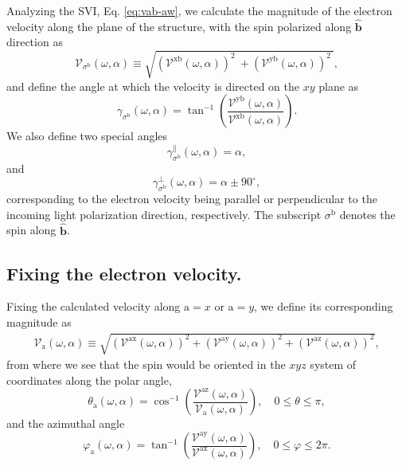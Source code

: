 \documentclass[floatfix,prb,aps,superscriptaddress,showpacs,11pt,preprint,letterpaper]{revtex4}
\begin{document}
Analyzing the SVI, Eq. \eqref{eq:vab-aw}, we calculate the magnitude
of the electron velocity along the plane of the structure, with the spin
polarized along $\hat{\mathbf{b}}$ direction as
\begin{equation}
\mathcal{V}_{\sigma^{\mathrm{b}}}(\omega,\alpha)
\equiv
\sqrt{
\left(\mathcal{V}^{\mathrm{xb}}(\omega,\alpha)\right)^{2}\ +
\left(\mathcal{V}^{\mathrm{yb}}(\omega,\alpha)\right)^{2}\ 
}, 
\label{eq:vs-mag}
\end{equation}
and define the angle at which the velocity is directed on the $xy$ plane as
\begin{equation}
\gamma_{\sigma^\mathrm{b}} (\omega,\alpha)
=
\tan^{-1} \left( \frac{\mathcal{V}^{\mathrm{yb}}(\omega,\alpha)}
{\mathcal{V}^{\mathrm{xb}}(\omega,\alpha)} \right)
.
\label{eq:gamma-ang}
\end{equation}
We also define two special angles
\begin{equation}
\gamma_{\sigma^\mathrm{b}}^\parallel(\omega,\alpha) = \alpha, 
\label{eq:gamma-par} 
\end{equation}
and
\begin{equation}
\gamma_{\sigma^\mathrm{b}}^\perp(\omega,\alpha) = \alpha \pm 90^{\circ},
\label{eq:gamma-perp}
\end{equation}
corresponding to the electron velocity being parallel or perpendicular to the
incoming light polarization direction, respectively. 
The subscript $\sigma^\mathrm{b}$
denotes the spin along $\hat{\mathbf{b}}$.

\subsection{Fixing the electron velocity.}\label{sec:theory-fixvel}

Fixing the calculated velocity along $\mathrm{a}=x$ or $\mathrm{a}=y$, we
define its corresponding magnitude as
\begin{align}
\mathcal{V}_{\mathrm{a}}(\omega,\alpha) \equiv 
\sqrt { 
\left(\mathcal{V}^{\mathrm{ax}}(\omega,\alpha)\right)^{2} +
\left(\mathcal{V}^{\mathrm{ay}}(\omega,\alpha)\right)^{2} +
\left(\mathcal{V}^{\mathrm{az}}(\omega,\alpha)\right)^{2} 
},
\label{eq:vv-mag}
\end{align}
from where we see that the spin would be oriented in the $xyz$ system of
coordinates along the polar angle, 
\begin{equation}
\theta_{\mathrm{a}}  (\omega,\alpha) = 
\cos^{-1} \left( \frac{\mathcal{V}^{\mathrm{az}}(\omega,\alpha)}
{\mathcal{V}_{\mathrm{a}}(\omega,\alpha)} \right),
 \quad 0 \leq \theta \leq \pi, 
\label{eq:polar-ang}
\end{equation}
and the azimuthal angle
\begin{equation}
\varphi_{\mathrm{a}} (\omega,\alpha) =
\tan^{-1} \left( \frac{\mathcal{V}^{\mathrm{ay}}(\omega,\alpha)}
{\mathcal{V}^{\mathrm{ax}}(\omega,\alpha)} \right),
\quad 0 \leq \varphi \leq 2\pi.
\label{eq:azimuthal-ang} 
\end{equation} 
\end{document}
